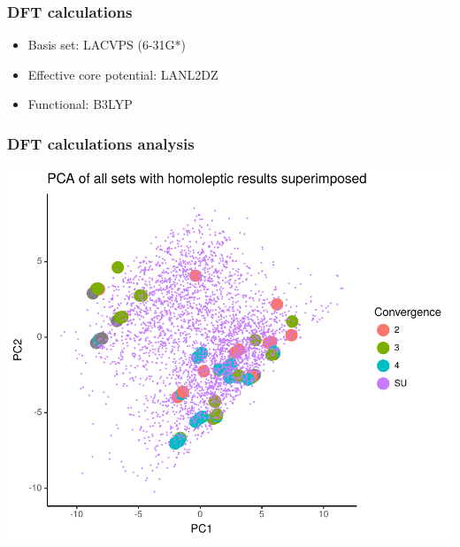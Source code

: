 \documentclass[xcolor=dvipsnames]{beamer}
\begin{document}
\begin{frame}
\frametitle{DFT calculations}

\begin{itemize}
\item Basis set: LACVPS (6-31G*)
\item Effective core potential: LANL2DZ
\item Functional: B3LYP
\end{itemize}
\end{frame}


\begin{frame}
\frametitle{DFT calculations analysis}
\includegraphics[width=0.6\linewidth]{img/pca_rf39_SplitIntoSU_convergence.pdf}
\end{frame}
\end{document}
